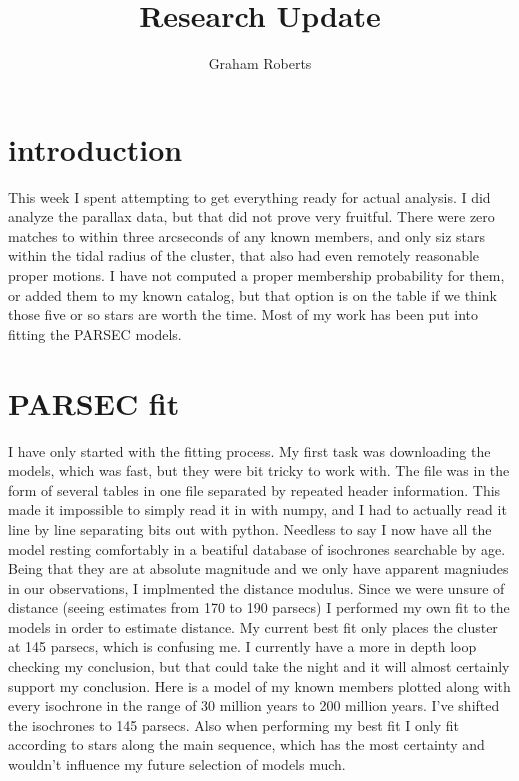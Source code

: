\documentclass{article}
\author{Graham Roberts}
\title{Research Update}
\begin{document}
\maketitle
\section{introduction}
This week I spent attempting to get everything ready for actual analysis.  I did analyze the parallax data, but that did not prove very fruitful.  There were zero matches to within three arcseconds of any known members, and only siz stars within the tidal radius of the cluster, that also had even remotely reasonable proper motions.  I have not computed a proper membership probability for them, or added them to my known catalog, but that option is on the table if we think those five or so stars are worth the time.  Most of my work has been put into fitting the PARSEC models.  

\section{PARSEC fit}
I have only started with the fitting process.  My first task was downloading the models, which was fast, but they were  bit tricky to work with.  The file was in the form of several tables in one file separated by repeated header information.  This made it impossible to simply read it in with numpy, and I had to actually read it line by line separating bits out with python.  Needless to say I now have all the model resting comfortably in a beatiful database of isochrones searchable by age.  Being that they are at absolute magnitude and we only have apparent magniudes in our observations, I implmented the distance modulus.  Since we were unsure of distance (seeing estimates from 170 to 190 parsecs) I performed my own fit to the models in order to estimate distance.  My current best fit only places the cluster at 145 parsecs, which is confusing me.  I currently have a more in depth loop checking my conclusion, but that could take the night and it will almost certainly support my conclusion.  Here is a model of my known members plotted along with every isochrone in the range of 30 million years to 200 million years.  I've shifted the isochrones to 145 parsecs.  Also when performing my best fit I only fit according to stars along the main sequence, which has the most certainty and wouldn't influence my future selection of models much.
\end{document}
